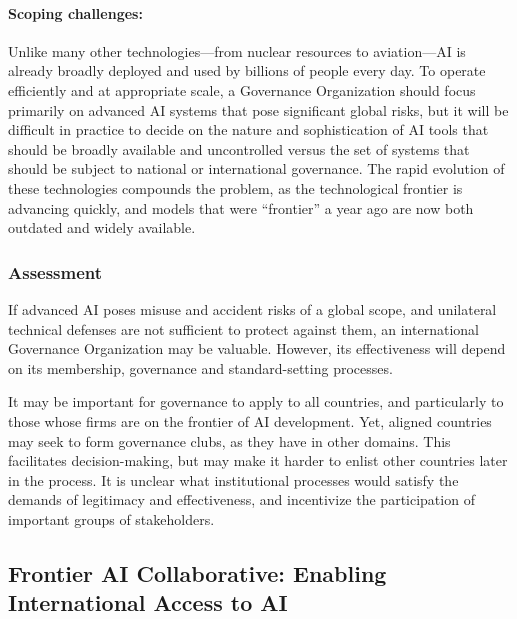 \documentclass[12pt]{article}
\begin{document}
\paragraph{Scoping challenges:} Unlike many other technologies---from
nuclear resources to aviation---AI is already broadly deployed and used
by billions of people every day. To operate efficiently and at
appropriate scale, a Governance Organization should focus primarily on
advanced AI systems that pose significant global risks, but it will be
difficult in practice to decide on the nature and sophistication of AI
tools that should be broadly available and uncontrolled versus the set
of systems that should be subject to national or
international governance. The rapid evolution of these technologies
compounds the problem, as the technological frontier is advancing
quickly, and models that were ``frontier'' a year ago are now both
outdated and widely available.


\subsubsection*{Assessment}

If advanced AI poses misuse and accident risks of a global scope, and
unilateral technical defenses are not sufficient to protect against
them, an international Governance Organization may be valuable. However,
its effectiveness will depend on its membership, governance and
standard-setting processes.

It may be important for governance to apply to all countries, and
particularly to those whose firms are on the frontier of AI development.
Yet, aligned countries may seek to form governance clubs, as they have
in other domains. This facilitates decision-making, but may make it
harder to enlist other countries later in the process. It is unclear
what institutional processes would satisfy the demands of legitimacy and
effectiveness, and incentivize the participation of important groups of
stakeholders.


\subsection{Frontier AI Collaborative: Enabling
International Access to AI
}
\end{document}
